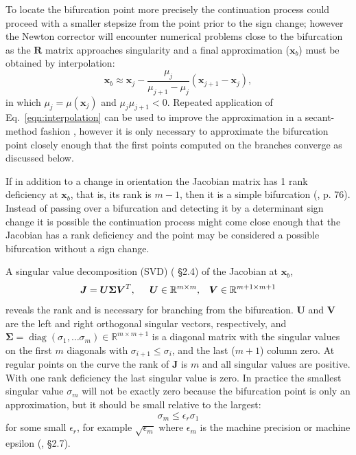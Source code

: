 \documentclass[10pt,openany,twoside]{book}
\numberwithin{equation}{section}   %
\newcommand{\Diag}{\operatorname{diag}}
\newcommand{\Matrix}[1]{\boldsymbol{#1}}
\newcommand{\Vector}[1]{\boldsymbol{#1}}
\newcommand{\Eqn}[1]{Eq.\ \ref{#1}}
\begin{document}
To locate the bifurcation point more precisely the
continuation process could proceed with a smaller stepsize from
the point prior to the sign change; however the Newton corrector will
encounter numerical problems close to the bifurcation as the $\Matrix{R}$
matrix approaches singularity
and a final approximation ($\Vector{x}_b$)
must be obtained by interpolation:
\begin{equation}
\label{eqn:interpolation}
\Vector{x}_b \approx \Vector{x}_j - \frac{\mu_j}{\mu_{j+1}
	- \mu_j}\left( \Vector{x}_{j+1} - \Vector{x}_j\right),
\end{equation}
in which $\mu_j = \mu(\Vector{x}_j)$ and $\mu_j\mu_{j+1} < 0$.
Repeated application of \Eqn{eqn:interpolation} can be used to
improve the approximation in a secant-method fashion \cite{keller1987lectures},
however it is only necessary to approximate the bifurcation
point closely enough that the first points computed on the
branches converge as discussed below.
\par
If in addition to a change in orientation the 
Jacobian matrix has 1 rank deficiency at $\Vector{x}_b$, that is,
its rank is $m-1$,
then it is a simple bifurcation (\cite{allgower1990numerical}, p. 76).
Instead of passing over a bifurcation and detecting it by a determinant sign
change it is possible the continuation process might come close enough
that the Jacobian has a rank deficiency and the point may be considered
a possible bifurcation without a sign change.
\par
A singular value decomposition (SVD) (\cite{golub2013matrix} \S 2.4)
of the Jacobian at $\Vector{x}_b$,
\begin{equation}
\Matrix{J} = \Matrix{U}\Matrix{\Sigma}\Matrix{V}^T, \hspace{0.2in} 
	\Matrix{U} \in \mathbb{R}^{m \times m}, \;\;\;
	\Matrix{V} \in \mathbb{R}^{m+1 \times m+1}		\nonumber
\end{equation}
reveals the rank and is necessary for branching from the bifurcation.
$\Matrix{U}$ and $\Matrix{V}$ are the left and right orthogonal singular
vectors, respectively, and
$\Matrix{\Sigma} = \Diag (\sigma_1, \dots \sigma_m) \in \mathbb{R}^{m \times m+1}$
is a diagonal matrix with the singular values on the first $m$ diagonals
with $\sigma_{i+1} \le \sigma_i$,
and the last ($m+1$) column zero.
At regular points on the curve
the rank of $\Matrix{J}$ is $m$ and all singular values
are positive.
With one rank deficiency the last singular value is zero.
In practice the smallest singular value $\sigma_m$ will not be exactly zero
because the bifurcation point is only an approximation, but it
should be small relative to the largest:
\begin{equation*}
\sigma_m \leq \epsilon_r \sigma_1
\end{equation*}
for some small $\epsilon_r$, for example $\sqrt{\epsilon_m}$
where $\epsilon_m$ is the machine precision or machine epsilon
(\cite{golub2013matrix}, \S 2.7).
\end{document}
